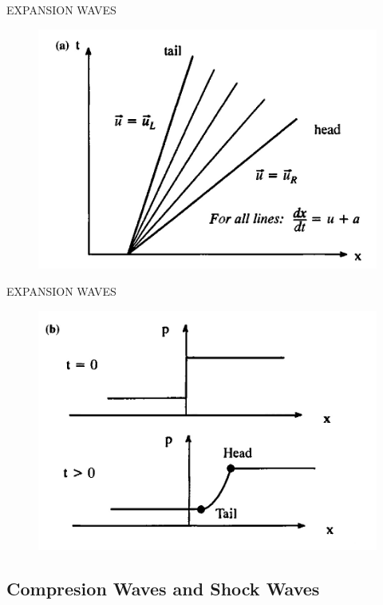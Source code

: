 \documentclass{beamer}
\begin{document}
\begin{frame}{EXPANSION WAVES}
  \begin{figure}
   \includegraphics[scale=0.38]{figures/expansionfan1.jpg}
  \end{figure}
\end{frame}

\begin{frame}{EXPANSION WAVES}
  \begin{figure}
   \includegraphics[scale=0.38]{figures/expansionfan2.jpg}
  \end{figure}
\end{frame}

\subsection{Compresion Waves and Shock Waves}
\end{document}
